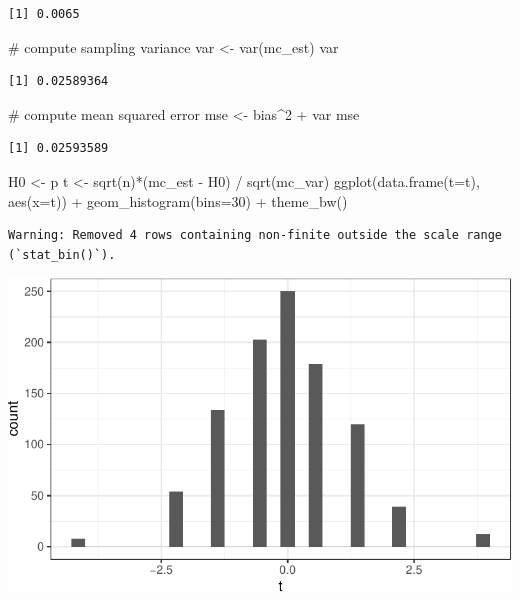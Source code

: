 \documentclass[
  letterpaper,
  DIV=11,
  numbers=noendperiod]{scrreprt}
\newenvironment{Shaded}{\begin{snugshade}}{\end{snugshade}}
\newcommand{\AttributeTok}[1]{\textcolor[rgb]{0.40,0.45,0.13}{#1}}
\newcommand{\CommentTok}[1]{\textcolor[rgb]{0.37,0.37,0.37}{#1}}
\newcommand{\DecValTok}[1]{\textcolor[rgb]{0.68,0.00,0.00}{#1}}
\newcommand{\FunctionTok}[1]{\textcolor[rgb]{0.28,0.35,0.67}{#1}}
\newcommand{\NormalTok}[1]{\textcolor[rgb]{0.00,0.23,0.31}{#1}}
\newcommand{\OtherTok}[1]{\textcolor[rgb]{0.00,0.23,0.31}{#1}}
\newcommand{\SpecialCharTok}[1]{\textcolor[rgb]{0.37,0.37,0.37}{#1}}
\begin{document}
\begin{verbatim}
[1] 0.0065
\end{verbatim}

\begin{Shaded}
\begin{Highlighting}[]
\CommentTok{\# compute sampling variance}
\NormalTok{var }\OtherTok{\textless{}{-}} \FunctionTok{var}\NormalTok{(mc\_est)}
\NormalTok{var}
\end{Highlighting}
\end{Shaded}

\begin{verbatim}
[1] 0.02589364
\end{verbatim}

\begin{Shaded}
\begin{Highlighting}[]
\CommentTok{\# compute mean squared error}
\NormalTok{mse }\OtherTok{\textless{}{-}}\NormalTok{ bias}\SpecialCharTok{\^{}}\DecValTok{2} \SpecialCharTok{+}\NormalTok{ var}
\NormalTok{mse}
\end{Highlighting}
\end{Shaded}

\begin{verbatim}
[1] 0.02593589
\end{verbatim}

\begin{Shaded}
\begin{Highlighting}[]
\NormalTok{H0 }\OtherTok{\textless{}{-}}\NormalTok{ p}
\NormalTok{t }\OtherTok{\textless{}{-}} \FunctionTok{sqrt}\NormalTok{(n)}\SpecialCharTok{*}\NormalTok{(mc\_est }\SpecialCharTok{{-}}\NormalTok{ H0) }\SpecialCharTok{/} \FunctionTok{sqrt}\NormalTok{(mc\_var)}
\FunctionTok{ggplot}\NormalTok{(}\FunctionTok{data.frame}\NormalTok{(}\AttributeTok{t=}\NormalTok{t), }\FunctionTok{aes}\NormalTok{(}\AttributeTok{x=}\NormalTok{t)) }\SpecialCharTok{+}
  \FunctionTok{geom\_histogram}\NormalTok{(}\AttributeTok{bins=}\DecValTok{30}\NormalTok{) }\SpecialCharTok{+}
  \FunctionTok{theme\_bw}\NormalTok{()}
\end{Highlighting}
\end{Shaded}

\begin{verbatim}
Warning: Removed 4 rows containing non-finite outside the scale range
(`stat_bin()`).
\end{verbatim}

\includegraphics{07-inference_files/figure-pdf/unnamed-chunk-10-1.pdf}
\end{document}
